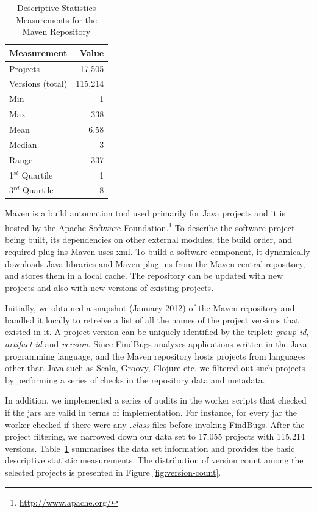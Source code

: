 \documentclass[conference]{llncs}
\begin{document}
\begin{table}
\centering
\caption{Descriptive Statistics Measurements for the Maven Repository}
\label{tbl:repository}
\begin{tabular}{l r}
\hline
Measurement & Value\\
 \hline
Projects & 17,505\\
Versions (total) & 115,214\\
Min & 1\\
Max & 338\\
Mean & 6.58\\
Median & 3\\
Range & 337\\
1$^{st}$ Quartile & 1\\
3$^{rd}$ Quartile & 8\\
\hline
\end{tabular}
\end{table}

Maven is a build automation tool used primarily for Java projects and it is
hosted by the Apache Software Foundation.\footnote{\url{http://www.apache.org/}}
To describe the software project being built, its dependencies
on other external modules, the build order, and required plug-ins Maven uses
{\sc xml}. To build a software component, it dynamically downloads Java libraries
and Maven plug-ins from the Maven central repository,
and stores them in a local cache. The repository can be updated with
new projects and also with new versions of existing projects.

Initially, we obtained a snapshot (January 2012) of the Maven repository and
handled it locally to retreive a list of all the names of the project versions
that existed in it. A project version can be uniquely identified by the triplet:
{\it group id}, {\it artifact id} and {\it version}.
Since FindBugs analyzes applications written in the Java
programming language, and the Maven repository
hosts projects from languages other than Java such as Scala, Groovy,
Clojure etc. we filtered out such projects by performing a series of checks in
the repository data and metadata.

In addition, we implemented a series of audits in the worker scripts that
checked if the {\sc jar}s are valid in terms of implementation. For instance,
for every {\sc jar} the worker checked if there were any {\it .class} files
before invoking FindBugs. After the project filtering, we narrowed down
our data set to 17,055 projects with 115,214 versions.
Table~\ref{tbl:repository} summarises the data set information and
provides the basic descriptive statistic measurements. The distribution of version
count among the selected projects is presented in Figure \ref{fig:version-count}.
\end{document}
